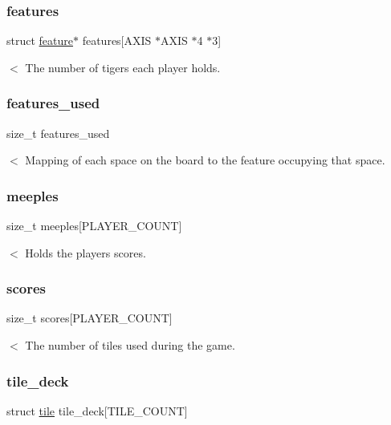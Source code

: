 \subsubsection{\texorpdfstring{features}{features}}
{\footnotesize\ttfamily struct \hyperlink{structfeature}{feature}$\ast$ features\mbox{[}A\+X\+IS $\ast$A\+X\+IS $\ast$4 $\ast$3\mbox{]}}

$<$ The number of tigers each player holds. \hypertarget{structgame_a5f38a6f289ba78fbdf22f092433ae522}{}\label{structgame_a5f38a6f289ba78fbdf22f092433ae522} 
\subsubsection{\texorpdfstring{features\+\_\+used}{features\_used}}
{\footnotesize\ttfamily size\+\_\+t features\+\_\+used}

$<$ Mapping of each space on the board to the feature occupying that space. \hypertarget{structgame_a8f23c0f5156ea251a207383a01da063d}{}\label{structgame_a8f23c0f5156ea251a207383a01da063d} 
\subsubsection{\texorpdfstring{meeples}{meeples}}
{\footnotesize\ttfamily size\+\_\+t meeples\mbox{[}P\+L\+A\+Y\+E\+R\+\_\+\+C\+O\+U\+NT\mbox{]}}

$<$ Holds the players\textquotesingle{} scores. \hypertarget{structgame_a727e232254a3086b4086da0fbf16ea00}{}\label{structgame_a727e232254a3086b4086da0fbf16ea00} 
\subsubsection{\texorpdfstring{scores}{scores}}
{\footnotesize\ttfamily size\+\_\+t scores\mbox{[}P\+L\+A\+Y\+E\+R\+\_\+\+C\+O\+U\+NT\mbox{]}}

$<$ The number of tiles used during the game. \hypertarget{structgame_ace0a9bc6809946175359836addeea842}{}\label{structgame_ace0a9bc6809946175359836addeea842} 
\subsubsection{\texorpdfstring{tile\+\_\+deck}{tile\_deck}}
{\footnotesize\ttfamily struct \hyperlink{structtile}{tile} tile\+\_\+deck\mbox{[}T\+I\+L\+E\+\_\+\+C\+O\+U\+NT\mbox{]}}

